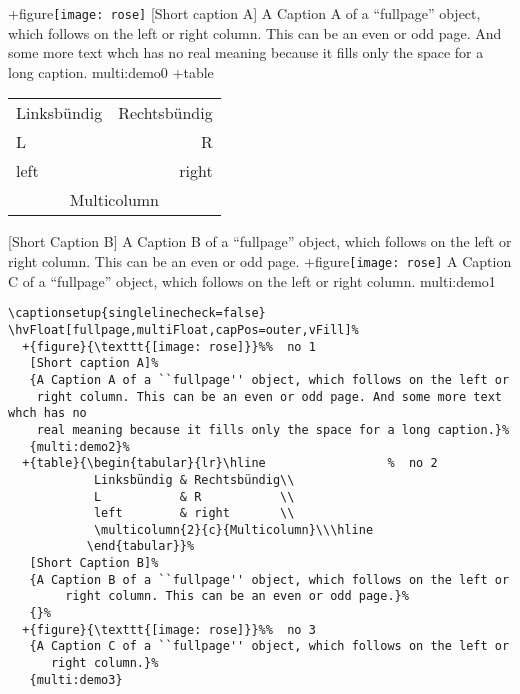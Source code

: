 \documentclass[twoside]{scrartcl}
\begin{document}
\hvFloat[fullpage,multiFloat,capPos=o,objectPos=c,vFill]%
  +{figure}{\texttt{[image: rose]}}%
   [Short caption A]%
   {A Caption A of a ``fullpage'' object, which follows on the left or
    right column. This can be an even or odd page. And some more text whch has no
    real meaning because it fills only the space for a long caption.}%
   {multi:demo0}%
  +{table}{\begin{tabular}{lr}\hline                 %
            Linksbündig & Rechtsbündig\\
            L           & R           \\
            left        & right       \\
            \multicolumn{2}{c}{Multicolumn}\\\hline
           \end{tabular}}%
   [Short Caption B]%
   {A Caption B of a ``fullpage'' object, which follows on the left or
        right column. This can be an even or odd page.}{}%
  +{figure}{\texttt{[image: rose]}}%
   {A Caption C of a ``fullpage'' object, which follows on the left or
      right column.}%
   {multi:demo1}



\blinddocument
\blindtext


\Blindtext

\begin{lstlisting}
\captionsetup{singlelinecheck=false}
\hvFloat[fullpage,multiFloat,capPos=outer,vFill]%
  +{figure}{\texttt{[image: rose]}}%%  no 1
   [Short caption A]%
   {A Caption A of a ``fullpage'' object, which follows on the left or
    right column. This can be an even or odd page. And some more text whch has no
    real meaning because it fills only the space for a long caption.}%
   {multi:demo2}%
  +{table}{\begin{tabular}{lr}\hline                 %  no 2
            Linksbündig & Rechtsbündig\\
            L           & R           \\
            left        & right       \\
            \multicolumn{2}{c}{Multicolumn}\\\hline
           \end{tabular}}%
   [Short Caption B]%
   {A Caption B of a ``fullpage'' object, which follows on the left or
        right column. This can be an even or odd page.}%
   {}%
  +{figure}{\texttt{[image: rose]}}%%  no 3
   {A Caption C of a ``fullpage'' object, which follows on the left or
      right column.}%
   {multi:demo3}
\end{lstlisting}
\end{document}
